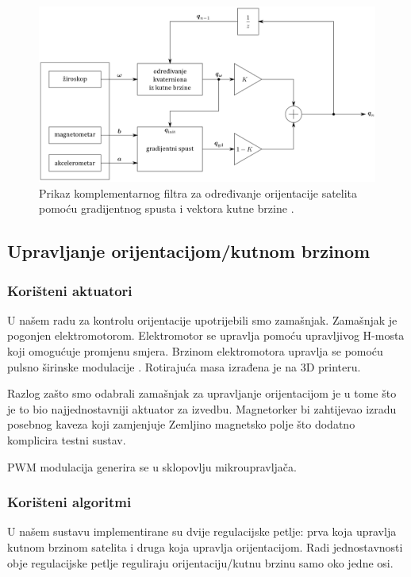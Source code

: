 \documentclass[times, utf8, diplomski, numeric]{templates/template}
\begin{document}
{{{{                \begin{figure}[htb]
                \centering
                \includegraphics[width=1.0\textwidth]{images/komp_filt_fig.png}
                \caption{Prikaz komplementarnog filtra za određivanje orijentacije satelita pomoću gradijentnog spusta i vektora kutne brzine \cite{uvod_u_svemirske}.}
                \label{fig:komp_filt_fig}
                \end{figure}
            }
        }


        \subsection{Upravljanje orijentacijom/kutnom brzinom}{
            \subsubsection{Korišteni aktuatori}{
                U našem radu za kontrolu orijentacije upotrijebili smo zamašnjak. Zamašnjak je pogonjen elektromotorom. Elektromotor se upravlja pomoću upravljivog H-mosta koji omogućuje promjenu smjera. Brzinom elektromotora upravlja se pomoću pulsno širinske modulacije . Rotirajuća masa izrađena je na 3D printeru.

                Razlog zašto smo odabrali zamašnjak za upravljanje orijentacijom je u tome što je to bio najjednostavniji aktuator za izvedbu. Magnetorker bi zahtijevao izradu posebnog kaveza koji zamjenjuje Zemljino magnetsko polje što dodatno komplicira testni sustav.

                PWM modulacija generira se u sklopovlju mikroupravljača.
            }

            \subsubsection{Korišteni algoritmi}{
                U našem sustavu implementirane su dvije regulacijske petlje: prva koja upravlja kutnom brzinom satelita i druga koja upravlja orijentacijom. Radi jednostavnosti obje regulacijske petlje reguliraju orijentaciju/kutnu brzinu samo oko jedne osi.

}}}}
\end{document}
